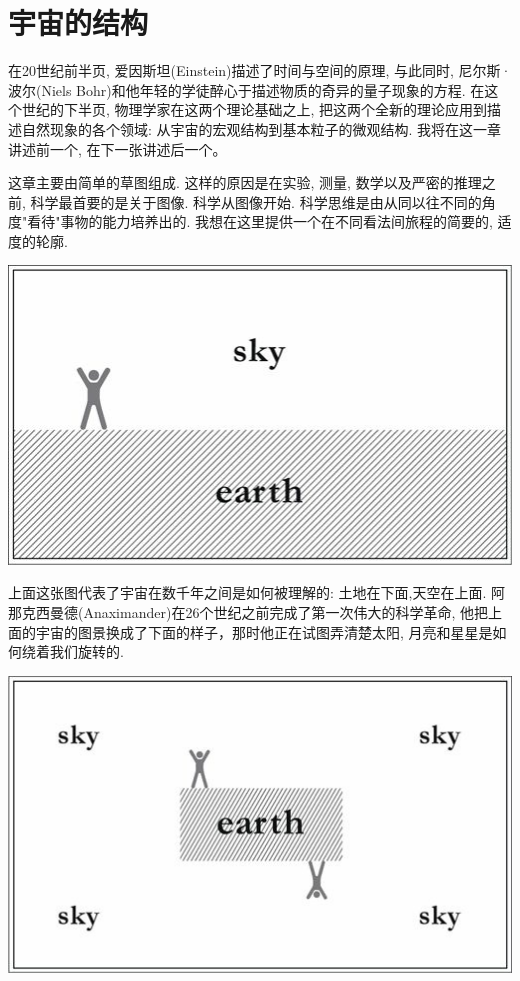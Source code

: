 	\chapter{宇宙的结构}
\indent

   在20世纪前半页, 爱因斯坦(Einstein)描述了时间与空间的原理, 与此同时, 尼尔斯·波尔(Niels Bohr)和他年轻的学徒醉心于描述物质的奇异的量子现象的方程. 在这个世纪的下半页, 物理学家在这两个理论基础之上, 把这两个全新的理论应用到描述自然现象的各个领域: 从宇宙的宏观结构到基本粒子的微观结构. 我将在这一章讲述前一个, 在下一张讲述后一个。

   这章主要由简单的草图组成. 这样的原因是在实验, 测量, 数学以及严密的推理之前, 科学最首要的是关于图像. 科学从图像开始. 科学思维是由从同以往不同的角度"看待"事物的能力培养出的. 我想在这里提供一个在不同看法间旅程的简要的, 适度的轮廓.
		
	\bc
	\includegraphics[width=.9\textwidth]{img/31.jpg}\\[12pt]
	\ec

   上面这张图代表了宇宙在数千年之间是如何被理解的: 土地在下面,天空在上面. 阿那克西曼德(Anaximander)在26个世纪之前完成了第一次伟大的科学革命, 他把上面的宇宙的图景换成了下面的样子，那时他正在试图弄清楚太阳, 月亮和星星是如何绕着我们旋转的.

	\bc
	\includegraphics[width=.9\textwidth]{img/32.jpg}\\[12pt]
	\ec

